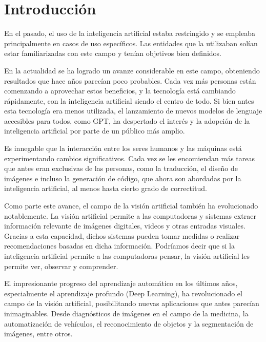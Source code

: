 \chapter*{Introducci\'on}\label{chapter:introduction}
En el pasado, el uso de la inteligencia artificial estaba restringido y se empleaba principalmente en casos de uso espec\'ificos. Las entidades que la utilizaban sol\'ian estar familiarizadas con este campo y ten\'ian objetivos bien definidos.

En la actualidad se ha logrado un avanze considerable en este campo, obteniendo resultados que hace años parec\'ian poco probables. Cada vez m\'as personas est\'an comenzando a aprovechar estos beneficios, y la tecnolog\'ia est\'a cambiando r\'apidamente, con la inteligencia artificial siendo el centro de todo. Si bien antes esta tecnolog\'ia era menos utilizada,  el lanzamiento de nuevos modelos de lenguaje accesibles para todos, como GPT, ha despertado el inter\'es y la adopci\'on de la inteligencia artificial por parte de un p\'ublico m\'as amplio.

Es innegable que la interacci\'on entre los seres humanos y las m\'aquinas est\'a experimentando cambios significativos. Cada vez se les encomiendan m\'as tareas que antes eran exclusivas de las personas, como la traducci\'on, el diseño de im\'agenes e incluso la generaci\'on de c\'odigo, que ahora son abordadas por la inteligencia artificial, al menos hasta cierto grado de correctitud.

Como parte este avance, el campo de la visi\'on artificial tambi\'en ha evolucionado notablemente. La visi\'on artificial permite a las computadoras y sistemas extraer informaci\'on relevante de im\'agenes digitales, videos y otras entradas visuales. Gracias a esta capacidad, dichos sistemas pueden tomar medidas o realizar recomendaciones basadas en dicha informaci\'on. Podr\'iamos decir que si la inteligencia artificial permite a las computadoras pensar, la visi\'on artificial les permite ver, observar y comprender.

El impresionante progreso del aprendizaje autom\'atico en los \'ultimos años, especialmente el aprendizaje profundo (Deep Learning), ha revolucionado el campo de la visi\'on artificial, posibilitando nuevas aplicaciones que antes parec\'ian inimaginables. Desde diagn\'osticos de im\'agenes en el campo de la medicina, la automatizaci\'on de veh\'iculos, el reconocimiento de objetos y la segmentaci\'on de im\'agenes, entre otros.

